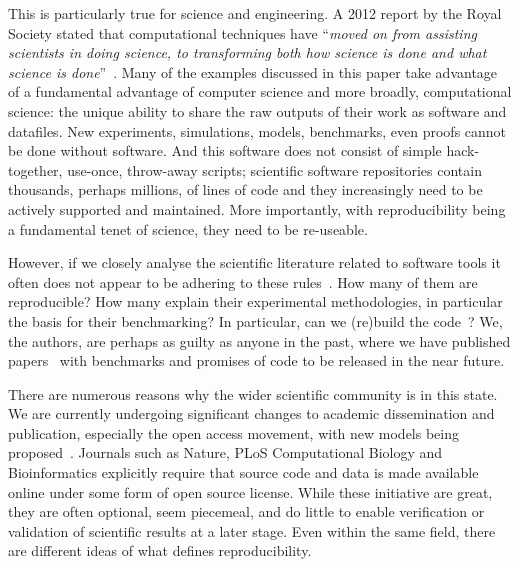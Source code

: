 \documentclass[a4paper,11pt]{article}
\begin{document}
This is particularly true for science and engineering. A 2012 report
by the Royal Society stated that computational techniques have
``{\emph{moved on from assisting scientists in doing science, to
transforming both how science is done and what science is
done}}''~\cite{rssaaoe:2012}. Many of the examples discussed in this
paper take advantage of a fundamental advantage of computer science
and more broadly, computational science: the unique ability to share
the raw outputs of their work as software and datafiles. New
experiments, simulations, models, benchmarks, even proofs cannot be
done without software. And this software does not consist of simple
hack-together, use-once, throw-away scripts; scientific software
repositories contain thousands, perhaps millions, of lines of code and
they increasingly need to be actively supported and maintained. More
importantly, with reproducibility being a fundamental tenet of
science, they need to be re-useable.

However, if we closely analyse the scientific literature related to
software tools it often does not appear to be adhering to these
rules~\cite{nature:2011}. How many of them are reproducible? How many
explain their experimental methodologies, in particular the basis for
their benchmarking? In particular, can we (re)build the
code~\cite{collberg-et-al:2014}? We, the authors, are perhaps as
guilty as anyone in the past, where we have published
papers~\cite{crick-et-al:2009a,Berdine2011SLAyer} with benchmarks and
promises of code to be released in the near future.

There are numerous reasons why the wider scientific community is in
this state. We are currently undergoing significant changes to
academic dissemination and publication, especially the open access
movement, with new models being
proposed~\cite{deroure:2010,stodden-et-al:2013,fursin+dubach:2014}. Journals
such as Nature, PLoS Computational Biology and Bioinformatics
explicitly require that source code and data is made available online
under some form of open source license. While these initiative are
great, they are often optional, seem piecemeal, and do little to
enable verification or validation of scientific results at a later
stage. Even within the same field, there are different ideas of what
defines reproducibility.
\end{document}
